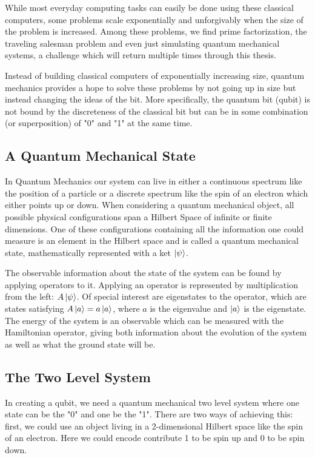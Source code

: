 While most everyday computing tasks can easily be done using these classical computers, some problems scale exponentially and unforgivably when the size of the problem is increased. Among these problems, we find prime factorization, the traveling salesman problem and even just simulating quantum mechanical systems, a challenge which will return multiple times through this thesis.

Instead of building classical computers of exponentially increasing size, quantum mechanics provides a hope to solve these problems by not going up in size but instead changing the ideas of the bit. More specifically, the quantum bit (qubit) is not bound by the discreteness of the classical bit but can be in some combination (or superposition) of "0" and "1" at the same time. 

\subsection{A Quantum Mechanical State}
In Quantum Mechanics our system can live in either a continuous spectrum like the position of a particle or a discrete spectrum like the spin of an electron which either points up or down. When considering a quantum mechanical object, all possible physical configurations span a Hilbert Space of infinite or finite dimensions. One of these configurations containing all the information one could measure is an element in the Hilbert space and is called a quantum mechanical state, mathematically represented with a ket $\ket{\psi}$. \cite{sakurai_modern_2021}

The observable information about the state of the system can be found by applying operators to it. Applying an operator is represented by multiplication from the left: $A\ket{\psi}$. Of special interest are eigenstates to the operator, which are states satisfying $A\ket{a} = a \ket{a}$, where $a$ is the eigenvalue and $\ket{a}$ is the eigenstate. The energy of the system is an observable which can be measured with the Hamiltonian operator, giving both information about the evolution of the system as well as what the ground state will be. \cite{sakurai_modern_2021}

\subsection{The Two Level System}\label{sec:tls}
In creating a qubit, we need a quantum mechanical two level system where one state can be the "0" and one be the "1". There are two ways of achieving this: first, we could use an object living in a 2-dimensional Hilbert space like the spin of an electron. Here we could encode contribute 1 to be spin up and 0 to be spin down. 

